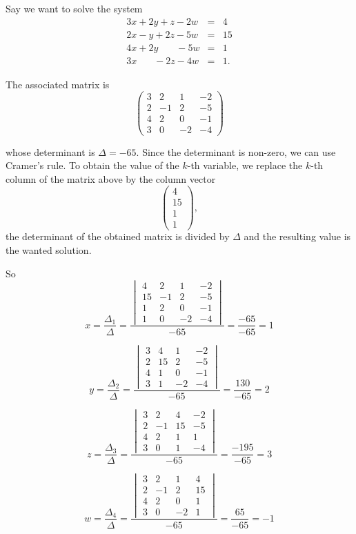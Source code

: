 \documentclass[12pt]{article}
\begin{document}
Say we want to solve the system
\begin{eqnarray*}
3x + 2y + z -2w&=&4\\
2x - y + 2z - 5w &=& 15\\
4x + 2y \phantom{+ 2x} - 5w&=&1\\
3x \phantom{+ 2y} - 2z -4w &=& 1.
\end{eqnarray*}

The associated matrix is 
$$\begin{pmatrix}
3 & 2 & 1 & -2\\
2 & -1 & 2 & -5\\
4 & 2 & 0 & -1 \\
3 & 0 & -2 & -4
\end{pmatrix}$$

whose determinant is $\Delta=-65$. Since the determinant is non-zero, we can use Cramer's rule. To obtain the value of the $k$-th variable, we replace the $k$-th column of the matrix above by the column vector 
$$\begin{pmatrix} 4\\ 15\\ 1\\ 1\end{pmatrix},$$ 
the determinant of the obtained matrix is divided by $\Delta$ and the resulting value is the wanted solution.

So
$$
x=\frac{\Delta_1}{\Delta}=
\frac{
\begin{vmatrix}
4 & 2 & 1 & -2\\
15 & -1 & 2 & -5\\
1 & 2 & 0 & -1\\
1 & 0 & -2 & -4
\end{vmatrix}
}{-65}=\frac{-65}{-65}=1
$$

$$
y=\frac{\Delta_2}{\Delta}=
\frac{
\begin{vmatrix}
3 & 4 &  1 & -2\\
2 & 15 & 2 & -5\\
4 & 1 &  0 & -1\\
3 & 1 &  -2 & -4
\end{vmatrix}
}{-65}=\frac{130}{-65}=2
$$

$$
z=\frac{\Delta_3}{\Delta}=
\frac{
\begin{vmatrix}
3 & 2 & 4 &  -2\\
2 & -1 & 15 & -5\\
4 & 2 & 1 &  1\\
3 & 0 & 1 &  -4
\end{vmatrix}
}{-65}=\frac{-195}{-65}=3
$$

$$
w=\frac{\Delta_4}{\Delta}=
\frac{
\begin{vmatrix}
3 & 2 & 1& 4 \\
2 & -1 & 2 & 15\\
4 & 2 & 0 & 1 \\
3 & 0 &  -2 & 1
\end{vmatrix}
}{-65}=\frac{65}{-65}=-1
$$
\end{document}
